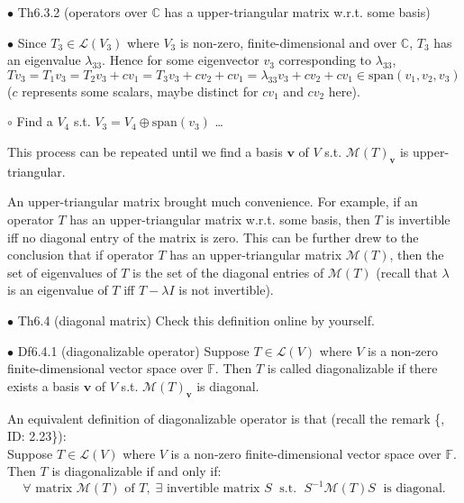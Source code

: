 \documentclass{article}
\begin{document}
\begin{Th}{$\bullet$ Th6.3.2 (operators over $\mathbb{C}$ has a upper-triangular matrix w.r.t. some basis)}
\begin{compactenum}
        \item[$\bullet$] Since $T_3\in\mathcal{L}(V_3)$ where $V_3$ is non-zero, finite-dimensional and over $\mathbb{C}$, $T_3$ has an eigenvalue $\lambda_{33}$. Hence for some eigenvector $v_3$ corresponding to $\lambda_{33}$, $Tv_3 = T_1v_3 = T_2v_3 + cv_1 = T_3v_3 + cv_2 + cv_1 = \lambda_{33}v_3 + cv_2 + cv_1 \in\text{span}(v_1, v_2, v_3)$ ($c$ represents some scalars, maybe distinct for $cv_1$ and $cv_2$ here).
        \item[$\circ$] Find a $V_4$ s.t. $V_3 = V_4 \oplus \text{span}(v_3)$ \dots 
    \end{compactenum}
    This process can be repeated until we find a basis $\pmb{v}$ of $V$ s.t. $\mathcal{M}(T)_{\pmb{v}}$ is upper-triangular.
\end{Th}

\begin{Rmk}{}
    An upper-triangular matrix brought much convenience. For example, \textcolor{Th}{if an operator $T$ has an upper-triangular matrix w.r.t. some basis, then $T$ is invertible iff no diagonal entry of the matrix is zero}. This can be further drew to the conclusion that \textcolor{Th}{if operator $T$ has an upper-triangular matrix $\mathcal{M}(T)$, then the set of eigenvalues of $T$ is the set of the diagonal entries of $\mathcal{M}(T)$ (recall that $\lambda$ is an eigenvalue of $T$ iff $T-\lambda I$ is not invertible).}
\end{Rmk}

\begin{Df}{$\bullet$ Th6.4 (diagonal matrix)}
    Check this definition online by yourself.
\end{Df}

\begin{Df}{$\bullet$ Df6.4.1 (diagonalizable operator)}
    Suppose $T\in\mathcal{L}(V)$ where $V$ is a non-zero finite-dimensional vector space over $\mathbb{F}$. Then $T$ is called diagonalizable if there exists a basis $\pmb{v}$ of $V$ s.t. $\mathcal{M}(T)_{\pmb{v}}$ is diagonal.
\end{Df}

\begin{Rmk}{}
    An equivalent definition of diagonalizable operator is that (recall the remark \{, ID: 2.23\}):\\
    \textcolor{Th}{Suppose $T\in\mathcal{L}(V)$ where $V$ is a non-zero finite-dimensional vector space over $\mathbb{F}$. Then $T$ is diagonalizable if and only if:
    $$\forall \text{ matrix } \mathcal{M}(T)\text{ of } T, \;\exists \text{ invertible matrix } S \;\text{ s.t. }\; S^{-1}\mathcal{M}(T)S \;\text{ is diagonal.}$$}
\end{Rmk}
\end{document}
